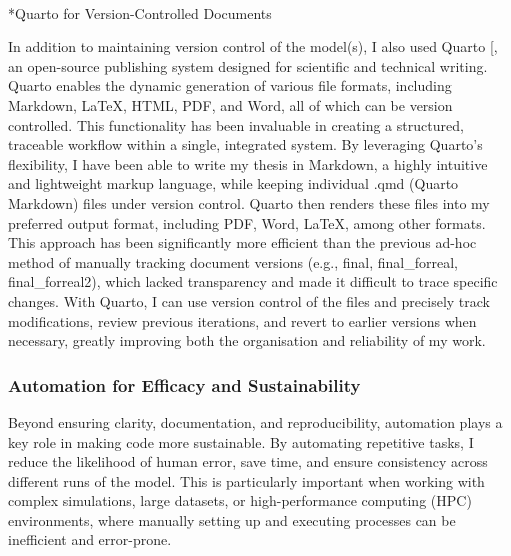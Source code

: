 \documentclass[
  11pt,
  letterpaper,
]{scrreprt}
\makeatletter
\let\oldparagraph\paragraph
\renewcommand{\paragraph}{
    \@ifstar
      \xxxParagraphStar
      \xxxParagraphNoStar
  }
\newcommand{\xxxParagraphStar}[1]{\oldparagraph*{#1}\mbox{}}
\newcommand{\xxxParagraphNoStar}[1]{\oldparagraph{#1}\mbox{}}
\makeatother
\begin{document}
\paragraph*{Quarto for Version-Controlled
Documents}\label{quarto-for-version-controlled-documents}

In addition to maintaining version control of the model(s), I also used
Quarto {[}\citeproc{ref-allaire2024Quarto}{398}{]}, an open-source
publishing system designed for scientific and technical writing. Quarto
enables the dynamic generation of various file formats, including
Markdown, LaTeX, HTML, PDF, and Word, all of which can be version
controlled. This functionality has been invaluable in creating a
structured, traceable workflow within a single, integrated system. By
leveraging Quarto's flexibility, I have been able to write my thesis in
Markdown, a highly intuitive and lightweight markup language, while
keeping individual .qmd (Quarto Markdown) files under version control.
Quarto then renders these files into my preferred output format,
including PDF, Word, LaTeX, among other formats. This approach has been
significantly more efficient than the previous ad-hoc method of manually
tracking document versions (e.g., final, final\_forreal,
final\_forreal2), which lacked transparency and made it difficult to
trace specific changes. With Quarto, I can use version control of the
files and precisely track modifications, review previous iterations, and
revert to earlier versions when necessary, greatly improving both the
organisation and reliability of my work.

\subsubsection*{Automation for Efficacy and
Sustainability}\label{automation-for-efficacy-and-sustainability}

Beyond ensuring clarity, documentation, and reproducibility, automation
plays a key role in making code more sustainable. By automating
repetitive tasks, I reduce the likelihood of human error, save time, and
ensure consistency across different runs of the model. This is
particularly important when working with complex simulations, large
datasets, or high-performance computing (HPC) environments, where
manually setting up and executing processes can be inefficient and
error-prone.
\end{document}
